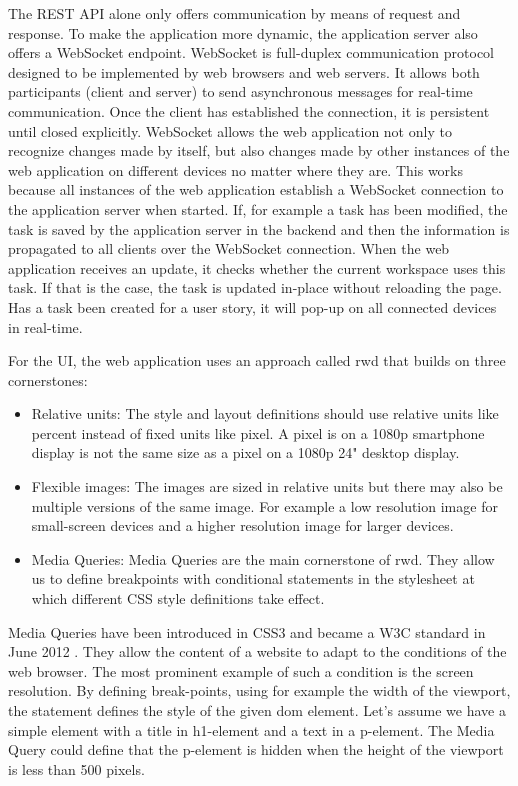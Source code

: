\documentclass{sigchi}
\begin{document}
The REST API alone only offers communication by means of request and response.
To make the application more dynamic, the application server also offers a WebSocket \cite{websocketRFC} endpoint.
WebSocket is full-duplex communication protocol designed to be implemented by web browsers and web servers.
It allows both participants (client and server) to send asynchronous messages for real-time communication.
Once the client has established the connection, it is persistent until closed explicitly.
WebSocket allows the web application not only to recognize changes made by itself, but also changes made by other instances of the web application on different devices no matter where they are.
This works because all instances of the web application establish a WebSocket connection to the application server when started.
If, for example a task has been modified, the task is saved by the application server in the backend and then the information is propagated to all clients over the WebSocket connection.
When the web application receives an update, it checks whether the current workspace uses this task.
If that is the case, the task is updated in-place without reloading the page.
Has a task been created for a user story, it will pop-up on all connected devices in real-time.

For the UI, the web application uses an approach called \gls{rwd} that builds on three cornerstones:
\begin{itemize}
	\item Relative units: The style and layout definitions should use relative units like percent instead of fixed units like pixel. A pixel is on a 1080p smartphone display is not the same size as a pixel on a 1080p 24" desktop display. 
	\item Flexible images: The images are sized in relative units but there may also be multiple versions of the same image. For example a low resolution image for small-screen devices and a higher resolution image for larger devices.
	\item Media Queries: Media Queries are the main cornerstone of \gls{rwd}. They allow us to define breakpoints with conditional statements in the stylesheet at which different CSS style definitions take effect.
\end{itemize}

Media Queries have been introduced in CSS3 and became a W3C standard in June 2012 \cite{mediaqueriesW3C}.
They allow the content of a website to adapt to the conditions of the web browser.
The most prominent example of such a condition is the screen resolution.
By defining break-points, using for example the width of the viewport, the statement defines the style of the given \gls{dom} element.
Let's assume we have a simple element with a title in h1-element and a text in a p-element.
The Media Query could define that the p-element is hidden when the height of the viewport is less than 500 pixels.
\end{document}
